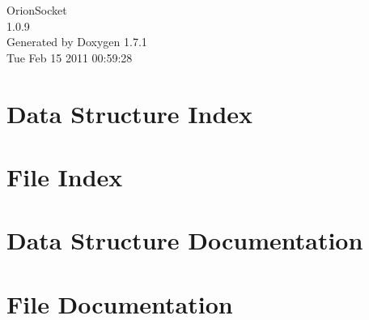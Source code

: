 \documentclass[a4paper]{book}
\begin{document}
\hypersetup{pageanchor=false}
\begin{titlepage}
\vspace*{7cm}
\begin{center}
{\Large OrionSocket \\[1ex]\large 1.0.9 }\\
\vspace*{1cm}
{\large Generated by Doxygen 1.7.1}\\
\vspace*{0.5cm}
{\small Tue Feb 15 2011 00:59:28}\\
\end{center}
\end{titlepage}
\clearemptydoublepage
{}
\tableofcontents
\clearemptydoublepage
{}
\hypersetup{pageanchor=true}
\chapter{Data Structure Index}

\chapter{File Index}

\chapter{Data Structure Documentation}




\chapter{File Documentation}











\printindex
\end{document}
